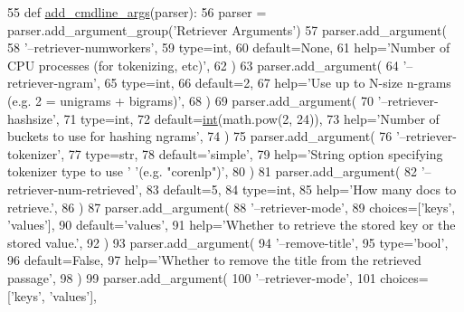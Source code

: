 \begin{DoxyCode}
55     \textcolor{keyword}{def }\hyperlink{namespaceparlai_1_1agents_1_1drqa_1_1config_a62fdd5554f1da6be0cba185271058320}{add\_cmdline\_args}(parser):
56         parser = parser.add\_argument\_group(\textcolor{stringliteral}{'Retriever Arguments'})
57         parser.add\_argument(
58             \textcolor{stringliteral}{'--retriever-numworkers'},
59             type=int,
60             default=\textcolor{keywordtype}{None},
61             help=\textcolor{stringliteral}{'Number of CPU processes (for tokenizing, etc)'},
62         )
63         parser.add\_argument(
64             \textcolor{stringliteral}{'--retriever-ngram'},
65             type=int,
66             default=2,
67             help=\textcolor{stringliteral}{'Use up to N-size n-grams (e.g. 2 = unigrams + bigrams)'},
68         )
69         parser.add\_argument(
70             \textcolor{stringliteral}{'--retriever-hashsize'},
71             type=int,
72             default=\hyperlink{namespacelanguage__model_1_1eval__ppl_a7d12ee00479673c5c8d1f6d01faa272a}{int}(math.pow(2, 24)),
73             help=\textcolor{stringliteral}{'Number of buckets to use for hashing ngrams'},
74         )
75         parser.add\_argument(
76             \textcolor{stringliteral}{'--retriever-tokenizer'},
77             type=str,
78             default=\textcolor{stringliteral}{'simple'},
79             help=\textcolor{stringliteral}{'String option specifying tokenizer type to use '} \textcolor{stringliteral}{'(e.g. "corenlp")'},
80         )
81         parser.add\_argument(
82             \textcolor{stringliteral}{'--retriever-num-retrieved'},
83             default=5,
84             type=int,
85             help=\textcolor{stringliteral}{'How many docs to retrieve.'},
86         )
87         parser.add\_argument(
88             \textcolor{stringliteral}{'--retriever-mode'},
89             choices=[\textcolor{stringliteral}{'keys'}, \textcolor{stringliteral}{'values'}],
90             default=\textcolor{stringliteral}{'values'},
91             help=\textcolor{stringliteral}{'Whether to retrieve the stored key or the stored value.'},
92         )
93         parser.add\_argument(
94             \textcolor{stringliteral}{'--remove-title'},
95             type=\textcolor{stringliteral}{'bool'},
96             default=\textcolor{keyword}{False},
97             help=\textcolor{stringliteral}{'Whether to remove the title from the retrieved passage'},
98         )
99         parser.add\_argument(
100             \textcolor{stringliteral}{'--retriever-mode'},
101             choices=[\textcolor{stringliteral}{'keys'}, \textcolor{stringliteral}{'values'}],

\end{DoxyCode}
